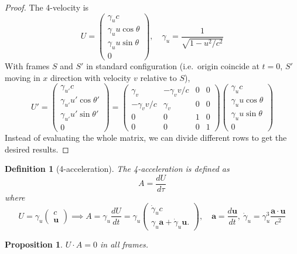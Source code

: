 \documentclass[a4paper]{article}
\newtheorem{defi}{Definition}[section]
\newtheorem{prop}{Proposition}[section]
\theoremstyle{new}
\begin{document}
\begin{proof}
The 4-velocity is
$$U =
  \begin{pmatrix}
    \gamma_u c\\
    \gamma_u u\cos \theta\\
    \gamma_u u\sin \theta\\
    0
  \end{pmatrix}, \quad \gamma_u = \frac{1}{\sqrt{1 - u^2/c^2}}$$
With frames $S$ and $S'$ in standard configuration (i.e.\ origin coincide at $t = 0$, $S'$ moving in $x$ direction with velocity $v$ relative to $S$),
\[
  U' = \begin{pmatrix}
    \gamma_{u'} c\\
    \gamma_{u'} u'\cos \theta'\\
    \gamma_{u'} u'\sin \theta'\\
    0
  \end{pmatrix}
  =
  \begin{pmatrix}
    \gamma_v & -\gamma_v v/c & 0 & 0\\
    -\gamma_{v} v/c & \gamma_v & 0 & 0\\
    0 & 0 & 1 & 0\\
    0 & 0 & 0 & 1
  \end{pmatrix}
  \begin{pmatrix}
    \gamma_u c\\
    \gamma_u u\cos \theta\\
    \gamma_u u\sin \theta\\
    0
  \end{pmatrix}
\]
Instead of evaluating the whole matrix, we can divide different rows to get the desired results.
\end{proof}
\begin{defi}[4-acceleration]
The 4-acceleration is defined as
$$ A = \frac{d U}{d \tau}$$
where
$$U = \gamma_u
  \begin{pmatrix}
    c\\
    \mathbf{u}
  \end{pmatrix}
\implies A = \gamma_u \frac{d U}{d t} = \gamma_u
  \begin{pmatrix}
    \dot{\gamma}_u c\\
    \gamma_u \mathbf{a} + \dot{\gamma}_u \mathbf{u}.
  \end{pmatrix},\quad
\mathbf{\mathbf{a}} = \frac{d \mathbf{u}}{d t},~\dot{\gamma}_u = \gamma_u^3 \frac{\mathbf{a}\cdot \mathbf{u}}{c^2}$$
\end{defi}
\begin{prop}
$U\cdot A=0$ in all frames.
\end{prop}
\end{document}
